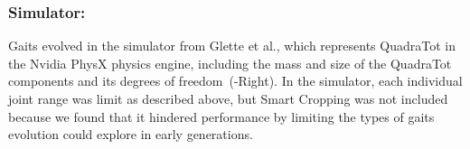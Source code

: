 
\subsubsection{Simulator:}
Gaits evolved in the simulator from Glette et al., which represents QuadraTot in the Nvidia PhysX physics engine\footnotemark[\value{footnote}], including the mass and size of the QuadraTot components and its degrees of freedom~(-Right). In the simulator, each individual joint range was limit as described above, but Smart Cropping was not included because we found that it hindered performance by limiting the types of gaits evolution could explore in early generations. 


